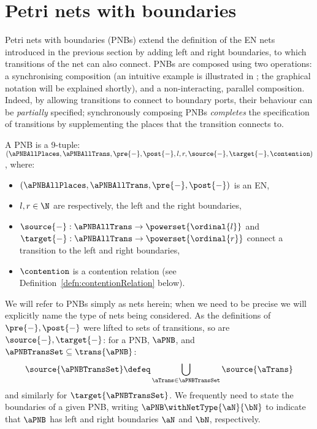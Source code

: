 \section{Petri nets with boundaries}

Petri nets with boundaries (PNBs) extend the definition of the EN nets introduced in the previous
section by adding left and right boundaries, to which transitions of the net can also connect. PNBs
are composed using two operations: a synchronising composition (an intuitive example is illustrated
in ; the graphical notation will be explained shortly), and a
non-interacting, parallel composition. Indeed, by allowing transitions to connect to boundary
ports, their behaviour can be \emph{partially} specified; synchronously composing PNBs
\emph{completes} the specification of transitions by
supplementing the places that the transition connects to.

\begin{definition}
    $ $\\
    A PNB is a 9-tuple:
    $(\aPNBAllPlaces, \aPNBAllTrans, \pre{-}, \post{-}, l, r, \source{-},
    \target{-}, \contention)$, where:
    \begin{itemize}
        \item $(\aPNBAllPlaces, \aPNBAllTrans, \pre{-}, \post{-})$ is an EN,
        \item $l,r \in \N$ are respectively, the left and the right
            boundaries,
        \item $\source{-} : \aPNBAllTrans \to \powerset{\ordinal{l}}$ and
            $\target{-} : \aPNBAllTrans \to \powerset{\ordinal{r}}$ connect a
            transition to the left and right boundaries,
        \item $\contention$ is a contention relation (see
            Definition~\ref{defn:contentionRelation} below).
    \end{itemize}
\end{definition}

We will refer to PNBs simply as nets herein; when we need to be precise we will
explicitly name the type of nets being considered. As the definitions of
$\pre{-},\post{-}$ were lifted to sets of transitions, so are $\source{-},
\target{-}$: for a PNB, $\aPNB$, and $\aPNBTransSet \subseteq \trans{\aPNB}$:
\[
    \source{\aPNBTransSet} \defeq \bigcup_{\aTrans \in \aPNBTransSet}\source{\aTrans}
\] and similarly for
$\target{\aPNBTransSet}$. We frequently need to state the boundaries of a given
PNB, writing $\aPNB \withNetType{\aN}{\bN}$ to indicate that $\aPNB$ has left
and right boundaries $\aN$ and $\bN$, respectively.

